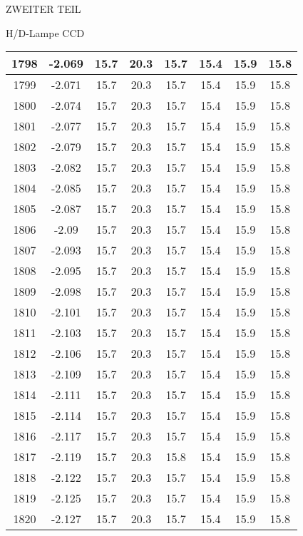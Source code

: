 \begin{appendix}
\begin{chapter}{ZWEITER TEIL}
\begin{section}{H/D-Lampe CCD}
\begin{scriptsize}
\begin{longtable}[htbp]{|c|c|c|c|c|c|c|c|}
            1798 & -2.069 & 15.7 & 20.3 & 15.7 & 15.4 & 15.9 & 15.8 \\ \hline
            1799 & -2.071 & 15.7 & 20.3 & 15.7 & 15.4 & 15.9 & 15.8 \\ \hline
            1800 & -2.074 & 15.7 & 20.3 & 15.7 & 15.4 & 15.9 & 15.8 \\ \hline
            1801 & -2.077 & 15.7 & 20.3 & 15.7 & 15.4 & 15.9 & 15.8 \\ \hline
            1802 & -2.079 & 15.7 & 20.3 & 15.7 & 15.4 & 15.9 & 15.8 \\ \hline
            1803 & -2.082 & 15.7 & 20.3 & 15.7 & 15.4 & 15.9 & 15.8 \\ \hline
            1804 & -2.085 & 15.7 & 20.3 & 15.7 & 15.4 & 15.9 & 15.8 \\ \hline
            1805 & -2.087 & 15.7 & 20.3 & 15.7 & 15.4 & 15.9 & 15.8 \\ \hline
            1806 & -2.09 & 15.7 & 20.3 & 15.7 & 15.4 & 15.9 & 15.8 \\ \hline
            1807 & -2.093 & 15.7 & 20.3 & 15.7 & 15.4 & 15.9 & 15.8 \\ \hline
            1808 & -2.095 & 15.7 & 20.3 & 15.7 & 15.4 & 15.9 & 15.8 \\ \hline
            1809 & -2.098 & 15.7 & 20.3 & 15.7 & 15.4 & 15.9 & 15.8 \\ \hline
            1810 & -2.101 & 15.7 & 20.3 & 15.7 & 15.4 & 15.9 & 15.8 \\ \hline
            1811 & -2.103 & 15.7 & 20.3 & 15.7 & 15.4 & 15.9 & 15.8 \\ \hline
            1812 & -2.106 & 15.7 & 20.3 & 15.7 & 15.4 & 15.9 & 15.8 \\ \hline
            1813 & -2.109 & 15.7 & 20.3 & 15.7 & 15.4 & 15.9 & 15.8 \\ \hline
            1814 & -2.111 & 15.7 & 20.3 & 15.7 & 15.4 & 15.9 & 15.8 \\ \hline
            1815 & -2.114 & 15.7 & 20.3 & 15.7 & 15.4 & 15.9 & 15.8 \\ \hline
            1816 & -2.117 & 15.7 & 20.3 & 15.7 & 15.4 & 15.9 & 15.8 \\ \hline
            1817 & -2.119 & 15.7 & 20.3 & 15.8 & 15.4 & 15.9 & 15.8 \\ \hline
            1818 & -2.122 & 15.7 & 20.3 & 15.7 & 15.4 & 15.9 & 15.8 \\ \hline
            1819 & -2.125 & 15.7 & 20.3 & 15.7 & 15.4 & 15.9 & 15.8 \\ \hline
            1820 & -2.127 & 15.7 & 20.3 & 15.7 & 15.4 & 15.9 & 15.8 \\ \hline

\end{longtable}
\end{scriptsize}
\end{section}
\end{chapter}
\end{appendix}
